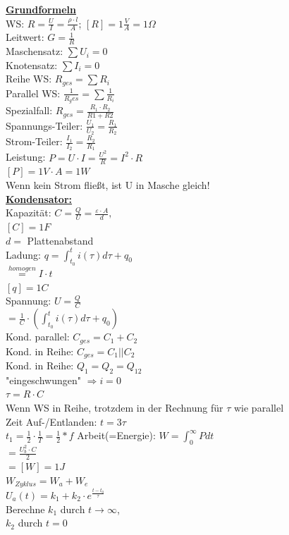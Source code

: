 \documentclass[11pt]{article}
\begin{document}
\begin{minipage}{0.45\textwidth}

\underline{\textbf{Grundformeln}}\\
WS: $R = \frac{U}{I} = \frac{\rho \cdot l}{A}$; $[R] = 1\frac{V}{A} =1 \Omega$\\
Leitwert: $G = \frac{1}{R}$\\
Maschensatz: $\sum U_i = 0$\\
Knotensatz: $\sum I_i = 0$\\
Reihe WS: $R_{ges} = \sum R_i$\\
Parallel WS: $\frac{1}{R_ges} = \sum \frac{1}{R_i}$\\
\phantom{ss} Spezialfall: $R_{ges} = \frac{R_1 \cdot R_2}{R1+R2} $\\
Spannungs-Teiler: $\frac{U_1}{U_2} = \frac{R_1}{R_2}$\\
Strom-Teiler: $\frac{I_1}{I_2} = \frac{R_2}{R_1}$\\
Leistung: $P =U \cdot I = \frac{U^2}{R} = I^2 \cdot R $ \\
\phantom{ssssssssss} $[P] = 1V \cdot A =1 W$\\
Wenn kein Strom fließt, ist U in Masche gleich!\\

\underline{\textbf{Kondensator:}}\\
Kapazität: $C = \frac{Q}{U} = \frac{\varepsilon \cdot A }{d},$\\
\phantom{ssssssssssii} $[C]=1F$\\
\phantom{sssssssssssii} $d =$ Plattenabstand\\
Ladung: $q = \int_{t_0}^t i(\tau) d\tau + q_0$\\
\phantom{sssssssis} $\stackrel{homogen}{=} I \cdot t$\\
\phantom{ssssssssssii} $[q]=1C$\\
Spannung: $U = \frac{Q}{C}$\\
\phantom{ssi} $= \frac{1}{C} \cdot (\int_{t_0}^t i(\tau) d\tau + q_0)$\\
Kond. parallel: $C_{ges} = C_1 + C_2$\\
Kond. in Reihe: $C_{ges} = C_1 || C_2$\\
Kond. in Reihe: $Q_1 = Q_2 = Q_{12}$\\
"eingeschwungen" $\Rightarrow i = 0$\\
$\tau = R \cdot C$\\
Wenn WS in Reihe, trotzdem in der Rechnung für $\tau$ wie parallel\\
Zeit Auf-/Entlanden: $t = 3\tau$\\
$t_1 = \frac{1}{2} \cdot \frac{1}{T} = \frac{1}{2} * f$
Arbeit(=Energie): $W = \int_0^\infty P dt$\\
\phantom{sssssssss} $= \frac{U_b^2 \cdot C}{2} $\\
\phantom{sssssssss} $= [W] = 1J $\\
$W_{Zyklus} = W_a + W_e$\\
$U_a(t) = k_1 + k_2 \cdot e^{\frac{t-t_0}{\tau}}$\\
Berechne $k_1$ durch $t \rightarrow \infty$,\\
$k_2$ durch $t = 0$\\


\end{minipage}
\end{document}
